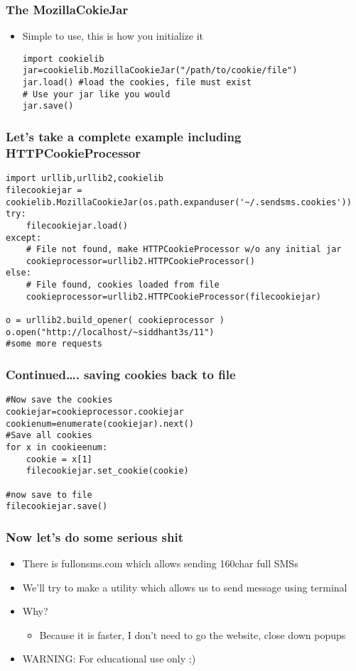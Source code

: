 \documentclass{beamer}
\begin{document}
\begin{frame}[fragile]
\frametitle{The MozillaCokieJar}
\label{sec-9_20}


\begin{itemize}
\item Simple to use, this is how you initialize it
   
\begin{verbatim}
import cookielib
jar=cookielib.MozillaCookieJar("/path/to/cookie/file")
jar.load() #load the cookies, file must exist
# Use your jar like you would 
jar.save()
\end{verbatim}
\end{itemize}
\end{frame}
\begin{frame}[fragile]
\frametitle{Let's take a complete example including HTTPCookieProcessor}
\label{sec-9_21}

\begin{verbatim}
import urllib,urllib2,cookielib
filecookiejar = cookielib.MozillaCookieJar(os.path.expanduser('~/.sendsms.cookies'))
try:
    filecookiejar.load()
except:
    # File not found, make HTTPCookieProcessor w/o any initial jar
    cookieprocessor=urllib2.HTTPCookieProcessor()
else:
    # File found, cookies loaded from file
    cookieprocessor=urllib2.HTTPCookieProcessor(filecookiejar)
    
o = urllib2.build_opener( cookieprocessor )
o.open("http://localhost/~siddhant3s/11")
#some more requests
\end{verbatim}
\end{frame}
\begin{frame}[fragile]
\frametitle{Continued\ldots{}. saving cookies back to file}
\label{sec-9_22}

\begin{verbatim}
#Now save the cookies
cookiejar=cookieprocessor.cookiejar
cookienum=enumerate(cookiejar).next()
#Save all cookies
for x in cookieenum:
    cookie = x[1]
    filecookiejar.set_cookie(cookie)

#now save to file
filecookiejar.save()
\end{verbatim}
\end{frame}
\begin{frame}
\frametitle{Now let's do some serious shit}
\label{sec-9_23}


\begin{itemize}
\item There is fullonsms.com which allows sending 160char full SMSs
\item We'll try to make a utility which allows us to send message using terminal
\item Why?
\begin{itemize}
\item Because it is faster, I don't need to go the website, close down popups
\end{itemize}
\item WARNING: For educational use only ;)
\end{itemize}
\end{frame}
\end{document}
